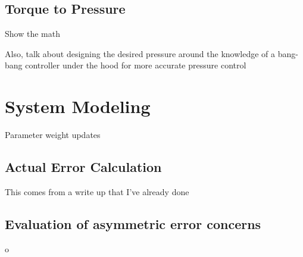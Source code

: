 
\subsection{Torque to Pressure}

Show the math

Also, talk about designing the desired pressure around the knowledge of a
bang-bang controller under the hood for more accurate pressure control

\section{System Modeling}

Parameter weight updates

\subsection{Actual Error Calculation}

This comes from a write up that I've already done

\subsection{Evaluation of asymmetric error concerns}o

